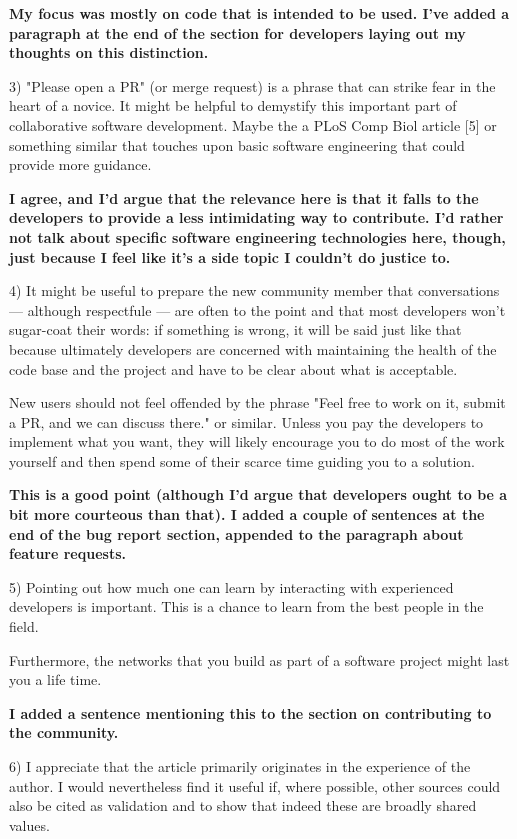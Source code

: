 \documentclass[11pt]{article}
\newcommand{\response}[1]{\textcolor{Mahogany}{\textbf{#1}}}
\begin{document}
\response{My focus was mostly on code that is intended to be used. I've added a
paragraph at the end of the section for developers laying out my thoughts on
this distinction.}

3) "Please open a PR" (or merge request) is a phrase that can strike
fear in the heart of a novice. It might be helpful to demystify
this important part of collaborative software development. Maybe
the a PLoS Comp Biol article [5] or something similar that touches
upon basic software engineering that could provide more guidance.

\response{I agree, and I'd argue that the relevance here is that it falls to the
developers to provide a less intimidating way to contribute. I'd rather not talk
about specific software engineering technologies here, though, just because I
feel like it's a side topic I couldn't do justice to.}



4) It might be useful to prepare the new community member that
conversations — although respectfule — are often to the point and
that most developers won't sugar-coat their words: if something is
wrong, it will be said just like that because ultimately developers
are concerned with maintaining the health of the code base and the
project and have to be clear about what is acceptable.

New users should not feel offended by the phrase "Feel free to work
on it, submit a PR, and we can discuss there." or similar. Unless
you pay the developers to implement what you want, they will likely
encourage you to do most of the work yourself and then spend some
of their scarce time guiding you to a solution.

\response{This is a good point (although I'd argue that developers ought to be a bit more courteous than that). I added a couple of sentences at the end of the bug report section, appended to the paragraph about feature requests.}


5) Pointing out how much one can learn by interacting with experienced
developers is important. This is a chance to learn from the best
people in the field.

Furthermore, the networks that you build as part of a software
project might last you a life time.

\response{I added a sentence mentioning this to the section on contributing to the community.}


6) I appreciate that the article primarily originates in the
experience of the author. I would nevertheless find it useful if,
where possible, other sources could also be cited as validation and
to show that indeed these are broadly shared values.
\end{document}
